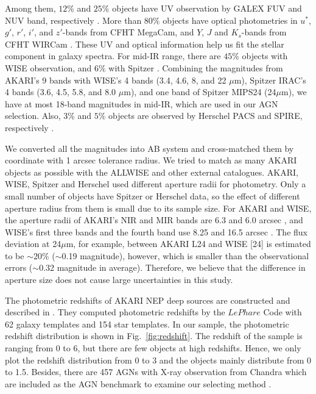 \documentclass[a4paper,fleqn,usenatbib]{mnras}
\begin{document}
Among them, $12\%$ and $25\%$ objects have UV observation by GALEX FUV and NUV band, respectively \citep{Buat et al. 2015}. More than $80\%$ objects have optical photometries in $u^*$, $g'$, $r'$, $i'$, and $z'$-bands from CFHT MegaCam, and $Y$, $J$ and $K_{s}$-bands from CFHT WIRCam \citep{Oi et al. 2014}. These UV and optical information help us fit the stellar component in galaxy spectra. For mid-IR range, there are $45\%$ objects with WISE observation, and $6\%$ with Spitzer \citep{Jarrett et al. 2011}. Combining the magnitudes from AKARI's 9 bands with WISE's 4 bands (3.4, 4.6, 8, and 22 $\mu$m), Spitzer IRAC's 4 bands (3.6, 4.5, 5.8, and 8.0 $\mu$m), and one band of Spitzer MIPS24 (24$\mu$m), we have at most 18-band magnitudes in mid-IR, which are used in our AGN selection. Also, $3\%$ and $5\%$ objects are observed by Herschel PACS and SPIRE, respectively \citep{Buat et al. 2015}. 

We converted all the magnitudes into AB system and cross-matched them by coordinate with 1 arcsec tolerance radius. We tried to match as many AKARI objects as possible with the ALLWISE and other external catalogues. AKARI, WISE, Spitzer and Herschel used different aperture radii for photometry. Only a small number of objects have Spitzer or Herschel data, so the effect of different aperture radius from them is small due to its sample size. For AKARI and WISE, the aperture radii of AKARI's NIR and MIR bands are 6.3 and 6.0 arcsec \citep{Murata et al. 2013}, and WISE's first three bands and the fourth band use 8.25 and 16.5 arcsec \citep{Wright et al. 2010}. The flux deviation at 24$\mu$m, for example, between AKARI L24 and WISE [24] is estimated to be $\sim$20$\%$ ($\sim$0.19 magnitude), however, which is smaller than the observational errors ($\sim$0.32 magnitude in average).  Therefore, we believe that the difference in aperture size does not cause large uncertainties in this study.  

The photometric redshifts of AKARI NEP deep sources are constructed and described in \citet{Oi et al. 2014}. They computed photometric redshifts by the $LePhare$ Code \citep{Arnouts et al. 1999} with 62 galaxy templates and 154 star templates. In our sample, the photometric redshift distribution is shown in Fig.~\ref{fig:redshift}. The redshift of the sample is ranging from 0 to 6, but there are few objects at high redshifts. Hence, we only plot the redshift distribution from 0 to 3 and the objects mainly distribute from 0 to 1.5. Besides, there are 457 AGNs with X-ray observation from Chandra which are included as the AGN benchmark to examine our selecting method \citep{Krumpe et al. 2015}. 
\end{document}

